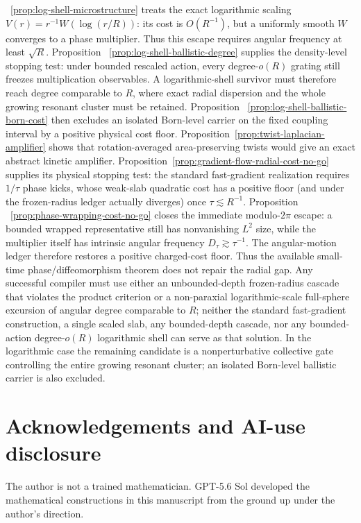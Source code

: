 \documentclass[11pt]{article}
\theoremstyle{remark}
\begin{document}
 ~\ref{prop:log-shell-microstructure} treats the exact logarithmic scaling
 $V(r)=r^{-1}W(\log(r/R))$: its cost is $O(R^{-1})$, but a uniformly smooth
 $W$ converges to a phase multiplier.  Thus this escape requires angular
 frequency at least $\sqrt R$.  Proposition
 ~\ref{prop:log-shell-ballistic-degree} supplies the density-level stopping
 test: under bounded rescaled action, every degree-$o(R)$ grating still
 freezes multiplication observables.  A logarithmic-shell survivor must
 therefore reach degree comparable to $R$, where exact radial dispersion and
 the whole growing resonant cluster must be retained.  Proposition
 ~\ref{prop:log-shell-ballistic-born-cost} then excludes an isolated
 Born-level carrier on the fixed coupling interval by a positive physical
 cost floor.
 Proposition~\ref{prop:twist-laplacian-amplifier} shows that rotation-averaged
 area-preserving twists would give an exact abstract kinetic amplifier.
 Proposition~\ref{prop:gradient-flow-radial-cost-no-go} supplies its physical
 stopping test: the standard fast-gradient realization requires
 $1/\tau$ phase kicks, whose weak-slab quadratic cost has a positive floor
 (and under the frozen-radius ledger actually diverges) once
 $\tau\lesssim R^{-1}$.  Proposition
 ~\ref{prop:phase-wrapping-cost-no-go} closes the immediate modulo-$2\pi$
 escape: a bounded wrapped representative still has nonvanishing $L^2$
 size, while the multiplier itself has intrinsic angular frequency
 $D_\tau\gtrsim\tau^{-1}$.  The angular-motion ledger therefore restores a
 positive charged-cost floor.  Thus the available small-time
 phase/diffeomorphism theorem does not repair the radial gap.  Any successful
 compiler must use either an unbounded-depth frozen-radius cascade that
 violates the product criterion or a non-paraxial logarithmic-scale
 full-sphere excursion of angular degree comparable to $R$; neither the
 standard fast-gradient construction, a single scaled slab, any
 bounded-depth cascade, nor any bounded-action degree-$o(R)$ logarithmic
 shell can serve as that solution.  In the logarithmic case the remaining
 candidate is a nonperturbative collective gate controlling the entire
 growing resonant cluster; an isolated Born-level ballistic carrier is also
 excluded.

\section*{Acknowledgements and AI-use disclosure}

The author is not a trained mathematician.  GPT-5.6 Sol developed the
mathematical constructions in this manuscript from the ground up under the
author's direction.
\end{document}
